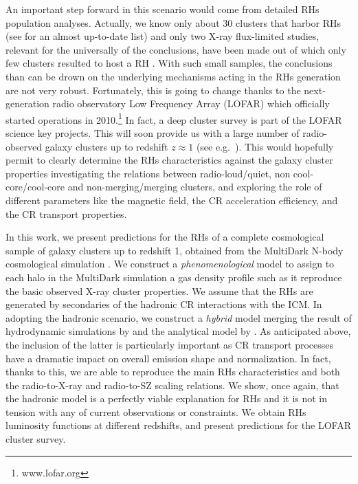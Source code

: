 \documentclass[traditabstract]{aa}
\begin{document}
An important step forward in this scenario would come from detailed RHs population analyses. Actually, we know only about 30 clusters that harbor RHs (see 
\citealp{2011A&A...527A..99E} for an almost up-to-date list) and only two X-ray flux-limited studies, relevant for the universally of the conclusions, 
have been made out of which only few clusters resulted to host a RH  \citep{1999NewA....4..141G,VenturiGMRT_2}. With such small samples, the
conclusions than can be drown on the underlying mechanisms acting in the RHs generation are not very robust. Fortunately, this is going to change thanks to 
the next-generation radio observatory Low Frequency Array (LOFAR) which officially started operations in 2010.\footnote[2]{www.lofar.org}
In fact, a deep cluster survey is part of the LOFAR science key projects. This will soon provide us with a large number of radio-observed galaxy clusters 
up to redshift $z\approx1$ (see e.g.~\citealp{2010A&A...509A..68C,2012JApA..tmp...34R}).
This would hopefully permit to clearly determine the RHs characteristics against the galaxy cluster properties investigating the relations between 
radio-loud/quiet, non cool-core/cool-core and non-merging/merging clusters, and exploring the role of different parameters like the magnetic field, 
the CR acceleration efficiency, and the CR transport properties.

In this work, we present predictions for the RHs of a complete cosmological sample of galaxy clusters up to redshift 1, obtained from the MultiDark N-body 
cosmological simulation \citep{2011arXiv1104.5130P}. We construct a \emph{phenomenological} model to assign to each halo in the MultiDark simulation 
a gas density profile such as it reproduce the basic observed X-ray cluster properties. We assume that the RHs are generated by secondaries of the hadronic 
CR interactions with the ICM. In adopting the hadronic scenario, we construct a \emph{hybrid} model merging the result of hydrodynamic simulations by \cite{2010MNRAS.409..449P} and the analytical model by \cite{2011A&A...527A..99E}.  As anticipated above, the inclusion of the latter is particularly important as CR transport 
processes have a dramatic impact on overall emission shape and normalization. In fact, thanks to this, we are able to reproduce the main RHs characteristics and both
the radio-to-X-ray and radio-to-SZ scaling relations. We show, once again, that the hadronic model is a perfectly viable explanation for RHs and it is not in tension 
with any of current observations or constraints. We obtain RHs luminosity functions at different redshifts, and present predictions for the LOFAR
cluster survey. 
\end{document}
